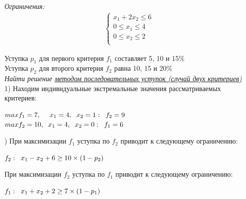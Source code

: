 \documentclass[14pt,fleqn]{extarticle}
\begin{document}
	\textit{Ограничения:}
	\begin{align*}
		\begin{cases}
			x_1 + 2x_2 \leq 6\\
			0 \leq x_1 \leq 4\\
			0 \leq x_2 \leq 2\\
		\end{cases}
	\end{align*}
	
	Уступка $p_1$ для первого критерия $f_1$ составляет 5, 10 и 15\%\\
	Уступка $p_2$ для второго критерия $f_2$ равна 10, 15 и 20\%\\
	
	\textit{Найти решение \underline{методом последовательных уступок (случай двух критериев)}}\\
	
	1) Находим индивидуальные экстремальные значения рассматриваемых критериев:
	\begin{center}
		$max f_1 = 7, \hspace{0.45cm} x_1 = 4, \hspace{0.2cm} x_2 = 1: \hspace{0.2cm} f_2 = 9$\\
		$max f_2 = 10, \hspace{0.2cm} x_1 = 4, \hspace{0.2cm} x_2 = 0: \hspace{0.2cm} f_1 = 6$
	\end{center}
	) При максимизации $f_1$ уступка по $f_2$ приводит к следующему ограничению:
	\begin{center}
		$f_2: \hspace{0.2cm} x_1 - x_2 + 6 \geq 10 \times (1 - p_2)$
	\end{center}
	При максимизации $f_2$ уступка по $f_1$ приводит к следующему ограничению:
	\begin{center}
		$f_1: \hspace{0.2cm} x_1 + x_2 + 2 \geq 7 \times (1 - p_1)$
	\end{center}
	
\end{document}
